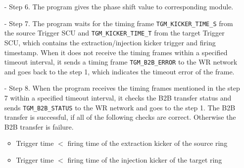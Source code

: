 \begin{itemize}
\begin{itemize}
		\item[-]Step 6. The program gives the phase shift value to corresponding module.
		\item[-]Step 7. The program waits for the timing frame \verb|TGM_KICKER_TIME_S| from the source Trigger SCU and \verb|TGM_KICKER_TIME_T| from the target Trigger SCU, which contains the extraction/injection kicker trigger and firing timestamp. When it does not receive the timing frames within a specified timeout interval, it sends a timing frame \verb|TGM_B2B_ERROR| to the WR network and goes back to the step 1, which indicates the timeout error of the frame.
		\item[-]Step 8. When the program receives the timing frames mentioned in the step 7 within a specified timeout interval, it checks the B2B transfer status and sends \verb|TGM_B2B_STATUS| to the WR network and goes to the step 1. The B2B transfer is successful, if all of the following checks are correct. Otherwise the B2B transfer is failure. 
\begin{itemize}
	\item Trigger time $<$ firing time of the extraction kicker of the source ring

	\item Trigger time $<$ firing time of the injection kicker of the target ring

\end{itemize}
 


\end{itemize}
\end{itemize}
